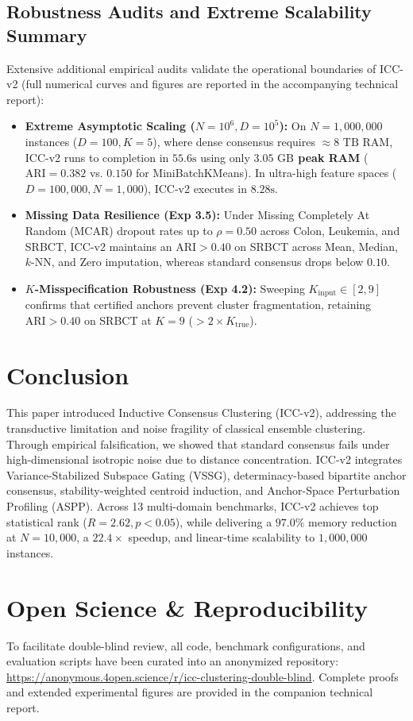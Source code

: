 \documentclass[10pt,conference]{IEEEtran}
\begin{document}
\subsection{Robustness Audits and Extreme Scalability Summary}
Extensive additional empirical audits validate the operational boundaries of ICC-v2 (full numerical curves and figures are reported in the accompanying technical report):
\begin{itemize}
    \item \textbf{Extreme Asymptotic Scaling ($N=10^6, D=10^5$):} On $N=1{,}000{,}000$ instances ($D=100, K=5$), where dense consensus requires $\approx 8\text{ TB}$ RAM, ICC-v2 runs to completion in \textbf{$55.6\text{s}$} using only \textbf{$3.05\text{ GB}$ peak RAM} ($\text{ARI} = 0.382$ vs. $0.150$ for MiniBatchKMeans). In ultra-high feature spaces ($D=100{,}000, N=1{,}000$), ICC-v2 executes in \textbf{$8.28\text{s}$}.
    \item \textbf{Missing Data Resilience (Exp 3.5):} Under Missing Completely At Random (MCAR) dropout rates up to $\rho=0.50$ across Colon, Leukemia, and SRBCT, ICC-v2 maintains an $\text{ARI} > 0.40$ on SRBCT across Mean, Median, $k$-NN, and Zero imputation, whereas standard consensus drops below $0.10$.
    \item \textbf{$K$-Misspecification Robustness (Exp 4.2):} Sweeping $K_{\text{input}} \in [2, 9]$ confirms that certified anchors prevent cluster fragmentation, retaining $\text{ARI} > 0.40$ on SRBCT at $K=9$ ($> 2\times K_{\text{true}}$).
\end{itemize}

\section{Conclusion}\label{sec:conclusion}

This paper introduced Inductive Consensus Clustering (ICC-v2), addressing the transductive limitation and noise fragility of classical ensemble clustering. Through empirical falsification, we showed that standard consensus fails under high-dimensional isotropic noise due to distance concentration. ICC-v2 integrates Variance-Stabilized Subspace Gating (VSSG), determinacy-based bipartite anchor consensus, stability-weighted centroid induction, and Anchor-Space Perturbation Profiling (ASPP). Across 13 multi-domain benchmarks, ICC-v2 achieves top statistical rank ($R=2.62, p < 0.05$), while delivering a $97.0\%$ memory reduction at $N=10{,}000$, a $22.4\times$ speedup, and linear-time scalability to $1{,}000{,}000$ instances.

\clearpage
{}



\section*{Open Science \& Reproducibility}
To facilitate double-blind review, all code, benchmark configurations, and evaluation scripts have been curated into an anonymized repository: \url{https://anonymous.4open.science/r/icc-clustering-double-blind}. Complete proofs and extended experimental figures are provided in the companion technical report.
\end{document}
